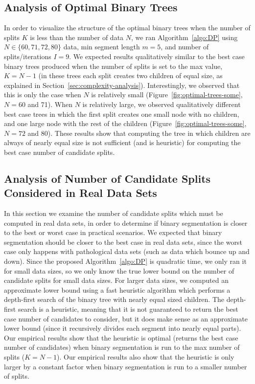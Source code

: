 \documentclass[algorithms,article,accept,oneauthor]{Definitions/mdpi}
\begin{document}
\subsection{Analysis of Optimal Binary Trees}
In order to visualize the structure of the optimal binary trees when the number of splits $K$ is less than the number of data $N$, we ran Algorithm~\ref{algo:DP} using $N\in\{60,71,72,80\}$ data, min segment length $m=5$, and number of splits/iterations $I=9$.
We expected results qualitatively similar to the best case binary trees produced when the number of splits is set to the max value, $K=N-1$ (in these trees each split creates two children of equal size, as explained in Section~\ref{sec:complexity-analysis}).
Interestingly, we observed that this is only the case when $N$ is relatively small (Figure~\ref{fig:optimal-trees-some}, $N=60$ and 71). 
When $N$ is relatively large, we observed qualitatively different best case trees in which the first split creates one small node with no children, and one large node with the rest of the children (Figure~\ref{fig:optimal-trees-some}, $N=72$ and 80).
These results show that computing the tree in which children are always of nearly equal size is not sufficient (and is heuristic) for computing the best case number of candidate splits.

\subsection{Analysis of Number of Candidate Splits Considered in Real Data Sets}

In this section we examine the number of candidate splits which must be computed in real data sets, in order to determine if binary segmentation is closer to the best or worst case in practical scenarios. 
We expected that binary segmentation should be closer to the best case in real data sets, since the worst case only happens with pathological data sets (such as data which bounce up and down).
Since the proposed Algorithm~\ref{algo:DP} is quadratic time, we only ran it for small data sizes, so we only know the true lower bound on the number of candidate splits for small data sizes.
{For larger data sizes, we computed an approximate lower bound using a fast heuristic algorithm which performs a depth-first search of the binary tree with nearly equal sized children.
The depth-first search is a heuristic, meaning that it is not guaranteed to return the best case number of candidates to consider, but it does make sense as an approximate lower bound (since it recursively divides each segment into nearly equal parts).
Our empirical results show that the heuristic is optimal (returns the best case number of candidates) when binary segmentation is run to the max number of splits ($K=N-1$).
Our empirical results also show that the heuristic is only larger by a constant factor when binary segmentation is run to a smaller number of splits.
}
\end{document}

